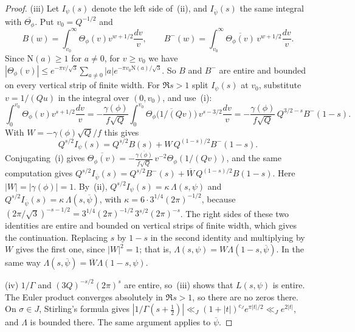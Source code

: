 \documentclass[11pt]{article}
\numberwithin{equation}{section}
\newcommand{\N}{\mathrm N}
\begin{document}
\begin{proof}
(iii) Let $I_\psi(s)$ denote the left side of~(ii), and $I_{\overline\psi}(s)$ the same integral with
$\overline{\Theta_\phi}$. Put $v_0=Q^{-1/2}$ and
\begin{equation}\label{eq:d155}
 B(w)=\int_{v_0}^\infty\Theta_\phi(v)v^{w+1/2}\frac{dv}v,\qquad
 B^-(w)=\int_{v_0}^\infty\overline{\Theta_\phi(v)}\,v^{w+1/2}\frac{dv}v .
\end{equation}
Since $\N(a)\ge1$ for $a\ne0$, for $v\ge v_0$ we have
$|\Theta_\phi(v)|\le e^{-\pi v/\sqrt3}\sum_{a\ne0}|a|e^{-\pi v_0\N(a)/\sqrt3}$. So $B$ and $B^-$ are entire and
bounded on every vertical strip of finite width. For $\Re s>1$ split $I_\psi(s)$ at $v_0$, substitute
$v=1/(Qu)$ in the integral over $(0,v_0)$, and use~(i):
\begin{equation}\label{eq:d156}
 \int_0^{v_0}\Theta_\phi(v)v^{s+1/2}\frac{dv}v
 =-\frac{\gamma(\phi)}{f\sqrt Q}\int_0^{v_0}\overline{\Theta_\phi\bigl(1/(Qv)\bigr)}\,v^{s-3/2}\frac{dv}v
 =-\frac{\gamma(\phi)}{f\sqrt Q}\,Q^{3/2-s}B^-(1-s).
\end{equation}
With $W=-\gamma(\phi)\sqrt Q/f$ this gives
\begin{equation}\label{eq:s2-split}
 Q^{s/2}I_\psi(s)=Q^{s/2}B(s)+W\,Q^{(1-s)/2}B^-(1-s).
\end{equation}
Conjugating~(i) gives $\overline{\Theta_\phi(v)}=-\frac{\overline{\gamma(\phi)}}{\bar f\sqrt Q}\,v^{-2}\Theta_\phi(1/(Qv))$,
and the same computation gives
$Q^{s/2}I_{\overline\psi}(s)=Q^{s/2}B^-(s)+\overline W\,Q^{(1-s)/2}B(1-s)$. Here $|W|=|\gamma(\phi)|=1$. By~(ii),
$Q^{s/2}I_\psi(s)=\kappa\,\Lambda(s,\psi)$ and $Q^{s/2}I_{\overline\psi}(s)=\kappa\,\Lambda(s,\overline\psi)$, with
$\kappa=6\cdot3^{1/4}(2\pi)^{-1/2}$, because $(2\pi/\sqrt3)^{-s-1/2}=3^{1/4}(2\pi)^{-1/2}\,3^{s/2}(2\pi)^{-s}$. The
right sides of these two identities are entire and bounded on vertical strips of finite width, which gives the
continuation. Replacing $s$ by $1-s$ in the second identity and multiplying by $W$ gives the first one, since
$|W|^2=1$; that is, $\Lambda(s,\psi)=W\Lambda(1-s,\overline\psi)$. In the same way
$\Lambda(s,\overline\psi)=\overline W\Lambda(1-s,\psi)$.

(iv) $1/\Gamma$ and $(3Q)^{-s/2}(2\pi)^s$ are entire, so~(iii) shows that $L(s,\psi)$ is entire. The Euler
product converges absolutely in $\Re s>1$, so there are no zeros there. On $\sigma\in J$, Stirling's formula gives
$|1/\Gamma(s+\frac12)|\ll_J(1+|t|)^{c_J}e^{\pi|t|/2}\ll_Je^{2|t|}$, and $\Lambda$ is bounded there. The same
argument applies to $\overline\psi$.
\end{proof}
\end{document}
